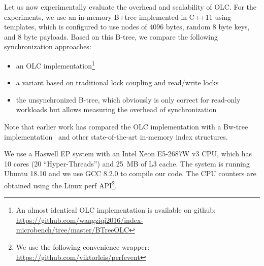 \documentclass[11pt]{article}
\begin{document}
Let us now experimentally evaluate the overhead and scalability of OLC.
For the experiments, we use an in-memory B+tree implemented in C++11 using templates, which is configured to use nodes of 4096 bytes, random 8 byte keys, and 8 byte payloads.
Based on this B-tree, we compare the following synchronization approaches:
\begin{itemize}
\item an OLC implementation\footnote{An almost identical OLC implementation is available on github: \url{https://github.com/wangziqi2016/index-microbench/tree/master/BTreeOLC}}
\item a variant based on traditional lock coupling and read/write locks
\item the unsynchronized B-tree, which obviously is only correct for read-only workloads but allows measuring the overhead of synchronization
\end{itemize}
Note that earlier work has compared the OLC implementation with a Bw-tree implementation~\cite{buzzword} and other state-of-the-art in-memory index structures.

We use a Haswell EP system with an Intel Xeon E5-2687W v3 CPU, which has 10 cores (20 ``Hyper-Threads'') and 25~MB of L3 cache.
The system is running Ubuntu 18.10 and we use GCC 8.2.0 to compile our code.
The CPU counters are obtained using the Linux perf API\footnote{We use the following convenience wrapper: \url{https://github.com/viktorleis/perfevent}}.
\end{document}
